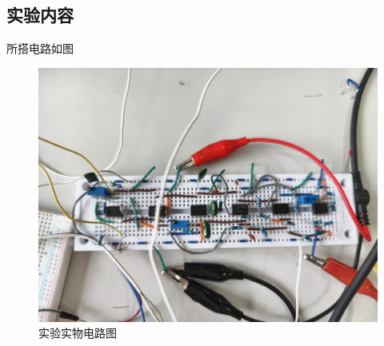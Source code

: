 \documentclass[12pt, a4paper]{article}
\begin{document}
\subsection{实验内容}
所搭电路如图
\begin{figure}[ht]
    \centering
    \includegraphics[width=\linewidth]{image/6.jpg}
    \caption{实验实物电路图}
    \label{fig:实验实物电路图}
\end{figure}
\end{document}
